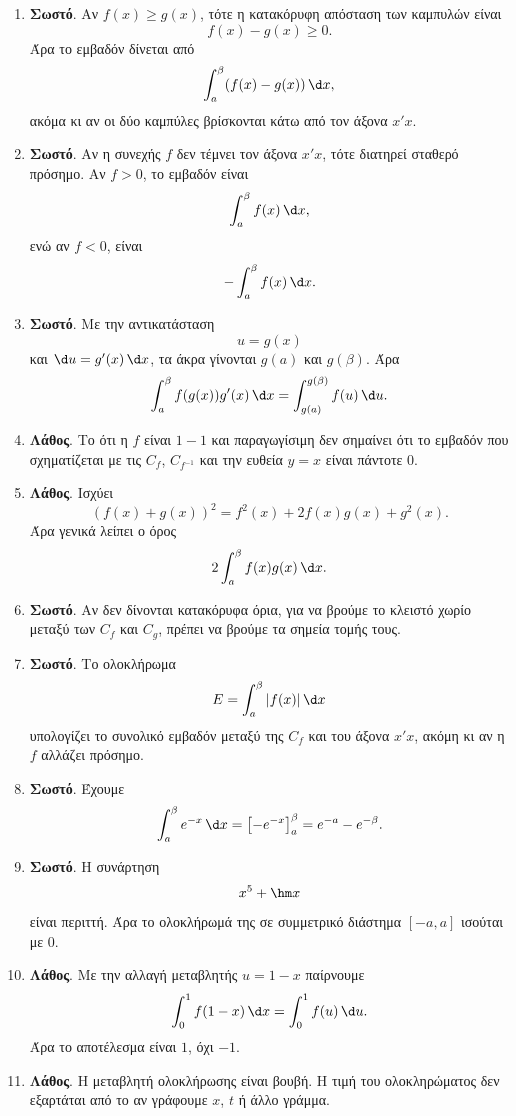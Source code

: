 \begin{enumerate}[label=\textbf{3.\arabic*.}]
\item \textbf{Σωστό}. Αν $f(x)\geq g(x)$, τότε η κατακόρυφη απόσταση των καμπυλών είναι
\[
f(x)-g(x)\geq0.
\]
Άρα το εμβαδόν δίνεται από
\[
\dint_a^\beta (f(x)-g(x))\,\d x,
\]
ακόμα κι αν οι δύο καμπύλες βρίσκονται κάτω από τον άξονα $x'x$.

\item \textbf{Σωστό}. Αν η συνεχής $f$ δεν τέμνει τον άξονα $x'x$, τότε διατηρεί σταθερό πρόσημο. Αν $f>0$, το εμβαδόν είναι
\[
\dint_a^\beta f(x)\,\d x,
\]
ενώ αν $f<0$, είναι
\[
-\dint_a^\beta f(x)\,\d x.
\]

\item \textbf{Σωστό}. Με την αντικατάσταση
\[
u=g(x)
\]
και $\d u=g'(x)\,\d x$, τα άκρα γίνονται $g(a)$ και $g(\beta)$. Άρα
\[
\dint_a^\beta f(g(x))g'(x)\,\d x
=
\dint_{g(a)}^{g(\beta)} f(u)\,\d u.
\]

\item \textbf{Λάθος}. Το ότι η $f$ είναι $1-1$ και παραγωγίσιμη δεν σημαίνει ότι το εμβαδόν που σχηματίζεται με τις $C_f$, $C_{f^{-1}}$ και την ευθεία $y=x$ είναι πάντοτε $0$.

\item \textbf{Λάθος}. Ισχύει
\[
(f(x)+g(x))^2=f^2(x)+2f(x)g(x)+g^2(x).
\]
Άρα γενικά λείπει ο όρος
\[
2\dint_a^\beta f(x)g(x)\,\d x.
\]

\item \textbf{Σωστό}. Αν δεν δίνονται κατακόρυφα όρια, για να βρούμε το κλειστό χωρίο μεταξύ των $C_f$ και $C_g$, πρέπει να βρούμε τα σημεία τομής τους.

\item \textbf{Σωστό}. Το ολοκλήρωμα
\[
E=\dint_a^\beta |f(x)|\,\d x
\]
υπολογίζει το συνολικό εμβαδόν μεταξύ της $C_f$ και του άξονα $x'x$, ακόμη κι αν η $f$ αλλάζει πρόσημο.

\item \textbf{Σωστό}. Έχουμε
\[
\dint_a^\beta e^{-x}\,\d x
=\left[-e^{-x}\right]_a^\beta
=e^{-a}-e^{-\beta}.
\]

\item \textbf{Σωστό}. Η συνάρτηση
\[
x^5+\hm x
\]
είναι περιττή. Άρα το ολοκλήρωμά της σε συμμετρικό διάστημα $[-a,a]$ ισούται με $0$.

\item \textbf{Λάθος}. Με την αλλαγή μεταβλητής $u=1-x$ παίρνουμε
\[
\dint_0^1 f(1-x)\,\d x=\dint_0^1 f(u)\,\d u.
\]
Άρα το αποτέλεσμα είναι $1$, όχι $-1$.

\item \textbf{Λάθος}. Η μεταβλητή ολοκλήρωσης είναι βουβή. Η τιμή του ολοκληρώματος δεν εξαρτάται από το αν γράφουμε $x$, $t$ ή άλλο γράμμα.


\end{enumerate}
